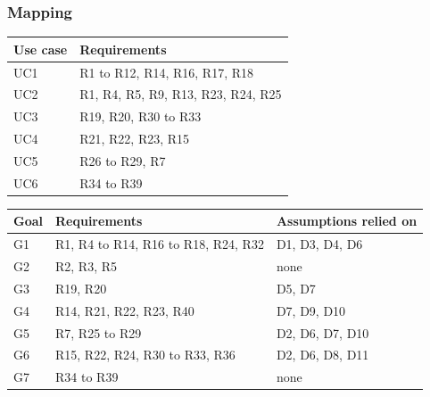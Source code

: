 \subsubsection{Mapping}
\begin{center}\small
\begin{tabularx}{\linewidth}{@{}l X@{}}
  \toprule
  Use case & Requirements \\
  \midrule
  UC1 & R1 to R12, R14, R16, R17, R18 \\
  UC2 & R1, R4, R5, R9, R13, R23, R24, R25 \\
  UC3 & R19, R20, R30 to R33 \\
  UC4 & R21, R22, R23, R15 \\
  UC5 & R26 to R29, R7 \\
  UC6 & R34 to R39 \\
  \bottomrule
\end{tabularx}

\medskip
\begin{tabularx}{\linewidth}{@{}l X X@{}}
  \toprule
  Goal & Requirements & Assumptions relied on \\
  \midrule
  G1 & R1, R4 to R14, R16 to R18, R24, R32 & D1, D3, D4, D6 \\
  G2 & R2, R3, R5 & none \\
  G3 & R19, R20 & D5, D7 \\
  G4 & R14, R21, R22, R23, R40 & D7, D9, D10 \\
  G5 & R7, R25 to R29 & D2, D6, D7, D10 \\
  G6 & R15, R22, R24, R30 to R33, R36 & D2, D6, D8, D11 \\
  G7 & R34 to R39 & none \\
  \bottomrule
\end{tabularx}
\end{center}

